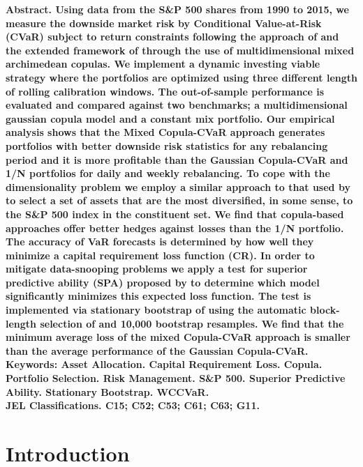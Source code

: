 \documentclass[a4paper,12pt]{report}
\begin{document}
\setlength{\baselineskip}{12pt}
\noindent\bf Abstract. \rm Using data from the S\&P 500 shares from 1990 to 2015, we measure the
downside market risk by Conditional Value-at-Risk (CVaR) subject to return
constraints following the approach of \citet*{rockafellar2000,rockafellar2002%
} and the extended framework of \citet*{kakouris14} through the use of
multidimensional mixed archimedean copulas. We implement a dynamic investing
viable strategy where the portfolios are optimized using three different length of
rolling calibration windows. The out-of-sample performance is evaluated and
compared against two benchmarks; a multidimensional gaussian copula model and a
constant mix portfolio. Our empirical analysis shows that the Mixed Copula-CVaR
approach generates portfolios with better downside risk statistics for any rebalancing period and it is more profitable than the Gaussian Copula-CVaR and 1/N portfolios for daily and weekly rebalancing. To cope with the dimensionality problem we employ a similar approach to that used by \citet*{ggr06} to select a set of assets that are the most
diversified, in some sense, to the S\&P 500 index in the constituent set. We find that copula-based approaches offer better hedges against losses than the 1/N portfolio. The accuracy of VaR forecasts is determined by how well they minimize a capital requirement loss function (CR). In order to mitigate data-snooping problems we apply a test for superior predictive ability (SPA) proposed by  \citet*{hansen2005test} to determine which model significantly minimizes this expected loss function. The test is implemented via stationary bootstrap of \citet*{pr94} using the automatic block-length selection of \citet*{pw04} and 10,000 bootstrap resamples. We find that the minimum average loss of the mixed Copula-CVaR approach is smaller than the average performance of the Gaussian Copula-CVaR.
\\[.1in]




\noindent \bf Keywords: \rm Asset Allocation. Capital Requirement Loss. Copula. Portfolio
Selection. Risk Management. S\&P 500. Superior Predictive Ability. Stationary Bootstrap. WCCVaR.\\[.1in]
\noindent \bf JEL Classifications. \rm C15; C52; C53; C61; C63; G11.
\clearpage



\setlength{\baselineskip}{12pt}

\section{Introduction}
\end{document}
